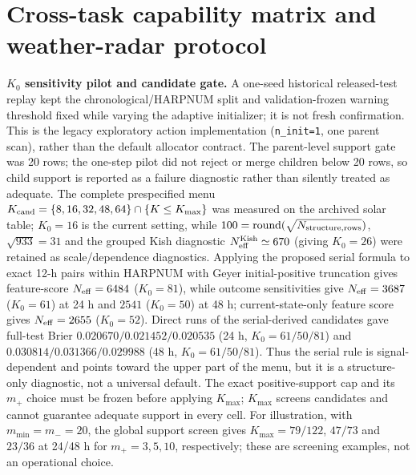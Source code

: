 \documentclass[11pt,a4paper]{article}
\numberwithin{equation}{section}
\theoremstyle{definition}\newtheorem{definition}[theorem]{Definition}
\theoremstyle{remark}\newtheorem{remark}[theorem]{Remark}
\begin{document}
\section{Cross-task capability matrix and weather-radar protocol}
\label{sec:capabilitymatrix}
\textbf{$K_0$ sensitivity pilot and candidate gate.} A one-seed historical released-test replay kept the chronological/HARPNUM split and validation-frozen warning threshold fixed while varying the adaptive initializer; it is not fresh confirmation. This is the legacy exploratory action implementation (\texttt{n\_init=1}, one parent scan), rather than the default allocator contract. The parent-level support gate was 20 rows; the one-step pilot did not reject or merge children below 20 rows, so child support is reported as a failure diagnostic rather than silently treated as adequate. The complete prespecified menu $K_{\rm cand}=\{8,16,32,48,64\}\cap\{K\le K_{\max}\}$ was measured on the archived solar table; $K_0=16$ is the current setting, while $100=\operatorname{round}(\sqrt{N_{\rm structure,rows}})$, $\sqrt{933}=31$ and the grouped Kish diagnostic $N_{\rm eff}^{\rm Kish}\simeq670$ (giving $K_0=26$) were retained as scale/dependence diagnostics. Applying the proposed serial formula to exact 12-h pairs within HARPNUM with Geyer initial-positive truncation gives feature-score $N_{\rm eff}=6484$ ($K_0=81$), while outcome sensitivities give $N_{\rm eff}=3687$ ($K_0=61$) at 24 h and $2541$ ($K_0=50$) at 48 h; current-state-only feature score gives $N_{\rm eff}=2655$ ($K_0=52$). Direct runs of the serial-derived candidates gave full-test Brier $0.020670/0.021452/0.020535$ (24 h, $K_0=61/50/81$) and $0.030814/0.031366/0.029988$ (48 h, $K_0=61/50/81$). Thus the serial rule is signal-dependent and points toward the upper part of the menu, but it is a structure-only diagnostic, not a universal default. The exact positive-support cap and its $m_+$ choice must be frozen before applying $K_{\max}$; $K_{\max}$ screens candidates and cannot guarantee adequate support in every cell. For illustration, with $m_{\min}=m_-=20$, the global support screen gives $K_{\max}=79/122$, $47/73$ and $23/36$ at 24/48 h for $m_+=3,5,10$, respectively; these are screening examples, not an operational choice.
\end{document}
